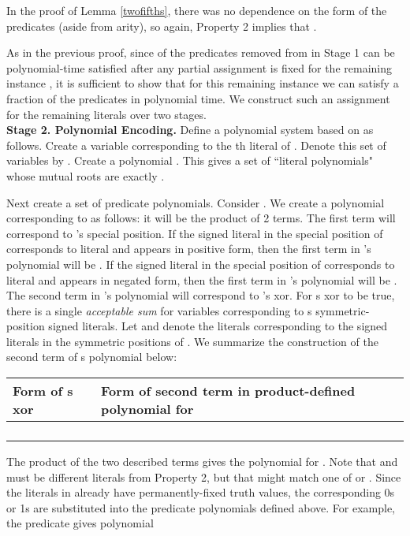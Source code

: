 \documentclass{article}
\begin{document}
In the proof of Lemma \ref{twofifths}, there was no dependence on the form of the predicates (aside from arity), so again, Property 2 implies that .

As in the previous proof, since  of the predicates removed from  in Stage 1 can be polynomial-time satisfied after any partial assignment is fixed for the remaining instance , it is sufficient to show that for this remaining instance we can satisfy a  fraction of the predicates in polynomial time. We construct such an assignment for the remaining literals over two stages.\\

\noindent \textbf{Stage 2. Polynomial Encoding. } Define a polynomial system based on  as follows. Create a variable  corresponding to the th literal of . Denote this set of variables by . Create a polynomial . This gives a set of  ``literal polynomials" whose mutual roots are exactly . 

Next create a set of predicate polynomials. Consider .
We create a polynomial corresponding to  as follows: it will be the product of 2 terms.  The first term will correspond to 's special position. If the signed literal in the special position of  corresponds to literal  and appears in positive form, then the first term in 's polynomial will be . If the signed literal in the special position of  corresponds to literal  and appears in negated form, then the first term in 's polynomial will be . The second term in 's polynomial will correspond to 's xor.  For s xor to be true, there is a single \textit{acceptable sum} for variables corresponding to s symmetric-position signed literals. Let  and  denote the literals corresponding to the signed literals in the symmetric positions of .  We summarize the construction of the second term of s polynomial below:\\
\begin{tabular}{l|l}
Form of s xor & Form of second term in product-defined polynomial for \\ \hline
 &  \\
 &  \\
 &  \\
 & \\
\end{tabular}

\vspace{4mm}
The product of the two described terms gives the polynomial for . Note that  and  must be different literals from Property 2, but that  might match one of  or .  Since the literals in  already have permanently-fixed truth values, the corresponding 0s or 1s are substituted into the predicate polynomials defined above.  
For example, the predicate  gives polynomial 
\end{document}

